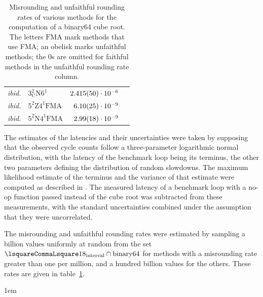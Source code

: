 ﻿\documentclass[10pt, a4paper, twoside]{basestyle}
\begin{document}
\begin{table}[b!]
\begin{center}
\begin{tabular}{rlrr}
\emph{ibid.}& $3^2_{\mathrm{C}}\mathrm{N}6^1$ & $2.415(50)\cdot10^{-6}$ \\
\emph{ibid.}& $5^2\mathrm{Z}4^1\mathrm{FMA}$  & $6.10(25)\cdot10^{-9}$ \\
\emph{ibid.}& $5^2\mathrm{N}4^1\mathrm{FMA}$  & $2.99(18)\cdot10^{-9}$
\end{tabular}
\end{center}
\caption{Misrounding and unfaithful rounding rates of various methods for the computation of a binary64 cube root.
The letters $\mathrm{FMA}$ mark methods that use FMA; an obelisk marks unfaithful methods; the $0$s are omitted
for faithful methods in the unfaithful rounding rate column.\label{TableMisroundingRates}}
\end{table}
The estimates of the latencies and their uncertainties were taken by supposing that the observed cycle counts follow
a three-parameter logarithmic normal distribution, with the latency of the benchmark loop being its terminus, the other two
parameters defining the distribution of random slowdowns. The maximum likelihood estimate of the terminus and the variance
of that estimate were computed as described in \cite{Cohen1951}.
The measured latency of a benchmark loop with a no-op function passed instead of the cube root was subtracted from these measurements,
with the standard uncertainties combined under the assumption that they were uncorrelated.

The misrounding and unfaithful rounding rates were estimated by sampling a billion values uniformly at random from the set
$\intclop{1}{8}\Intersection\text{binary64}$
for methods with a misrounding rate greater than one per million, and a hundred billion values for the others.
These rates are given in table~\ref{TableMisroundingRates}.

\emergencystretch 1em
\end{document}
